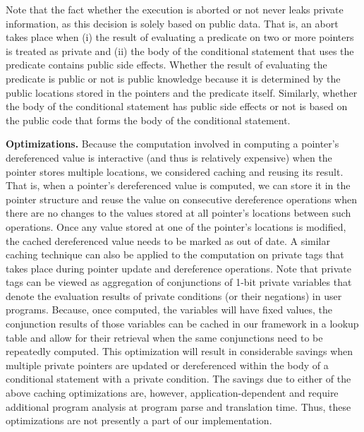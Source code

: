 \documentclass[11pt]{article}
\begin{document}
Note that the fact whether the execution is aborted or not never leaks
private information, as this decision is solely based on public
data. That is, an abort takes place when (i) the result of evaluating
a predicate on two or more pointers is treated as private and (ii) the
body of the conditional statement that uses the predicate contains
public side effects. Whether the result of evaluating the predicate is
public or not is public knowledge because it is determined by the
public locations stored in the pointers and the predicate
itself. Similarly, whether the body of the conditional statement has
public side effects or not is based on the public code that forms the
body of the conditional statement.

\medskip \noindent \textbf{Optimizations.} Because the computation involved
in computing a pointer's dereferenced value is interactive (and thus is
relatively expensive) when the pointer stores multiple locations, we
considered caching and reusing its result. That is, when a pointer's
dereferenced value is computed, we can store it in the pointer structure and
reuse the value on consecutive dereference operations when there are no
changes to the values stored at all pointer's locations  between such
operations. Once any value stored at one of the pointer's locations is
modified, the cached dereferenced value needs to be marked as out of date. A
similar caching technique can also be applied to the computation on private
tags that takes place during pointer update and dereference operations. Note
that private tags can be viewed as aggregation of conjunctions of 1-bit
private variables that denote the evaluation results of private conditions
(or their negations) in user programs. Because, once computed, the variables
will have fixed values, the conjunction results of those variables can be
cached in our framework in a lookup table and allow for their retrieval when
the same conjunctions need to be repeatedly computed. This optimization will
result in considerable savings when multiple private pointers are updated or
dereferenced within the body of a conditional statement with a private
condition. The savings due to either of the above caching optimizations are,
however, application-dependent and require additional program analysis at
program parse and translation time. Thus, these optimizations are not
presently a part of our implementation.
\end{document}
